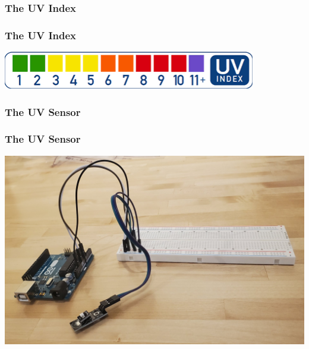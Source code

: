 \documentclass[10pt,aspectratio=169]{beamer} %
\begin{document}
\subsubsection{The UV Index}
\begin{frame}\centering
  \frametitle{The UV Index}
  \includegraphics{UVIndex.png}
\end{frame}
\subsubsection{The UV Sensor}
\begin{frame}\centering
  \frametitle{The UV Sensor}
  \includegraphics[scale = 0.2]{UVSensor.jpg}
\end{frame}
\end{document}
